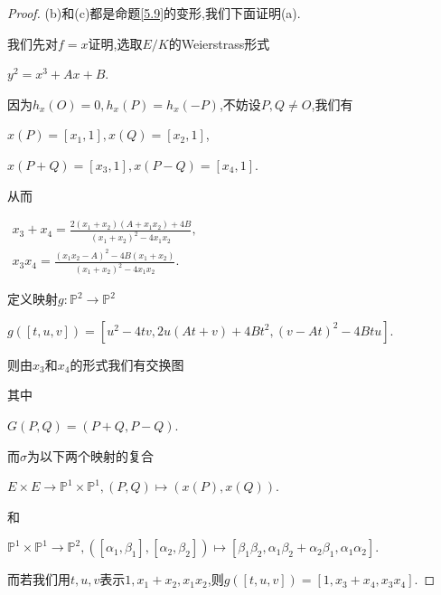 \documentclass[11pt]{ctexart}
\begin{document}
\begin{proof}
(b)和(c)都是命题\ref{5.9}的变形,我们下面证明(a).

我们先对$f=x$证明,选取$E/K$的Weierstrass形式
\begin{center}
    $y^2=x^3+Ax+B$.
\end{center}
 
因为$h_x(O)=0$$,h_x(P)=h_x(-P)$,不妨设$P,Q\neq O$,我们有
\begin{center}
    $x(P)=[x_1,1],x(Q)=[x_2,1]$,

    $x(P+Q)=[x_3,1],x(P-Q)=[x_4,1]$.
\end{center}
从而
\begin{center}

$\begin{array}{l}
    x_3+x_4=\frac{2(x_1+x_2)(A+x_1x_2)+4B}{(x_1+x_2)^2-4x_1x_2},\\

    x_3x_4=\frac{(x_1x_2-A)^2-4B(x_1+x_2)}{(x_1+x_2)^2-4x_1x_2}.
\end{array}$
\end{center}
定义映射$g:\mathbb{P}^2 \rightarrow \mathbb{P}^2$
\begin{center}
    $g([t,u,v])=[u^2-4tv,2u(At+v)+4Bt^2,(v-At)^2-4Btu]$.
\end{center}
则由$x_3$和$x_4$的形式我们有交换图

\begin{center}
      
\end{center}
\vspace*{-0.3cm}
其中
\begin{center}
    $G(P,Q)=(P+Q,P-Q)$.
\end{center}
而$\sigma $为以下两个映射的复合
\begin{center}
    $E \times E\rightarrow \mathbb{P}^1\times\mathbb{P}^1,(P,Q)\mapsto (x(P),x(Q))$.
\end{center}
和
\begin{center}
    $\mathbb{P}^1\times\mathbb{P}^1 \rightarrow \mathbb{P}^2,([\alpha_1,\beta_1],[\alpha_2,\beta_2])\mapsto [\beta_1\beta_2,\alpha_1\beta_2+\alpha_2\beta_1,\alpha_1\alpha_2]$.
\end{center}
而若我们用$t,u,v$表示$1,x_1+x_2,x_1x_2$,则$g([t,u,v])=[1,x_3+x_4,x_3x_4]$.


\end{proof}
\end{document}
